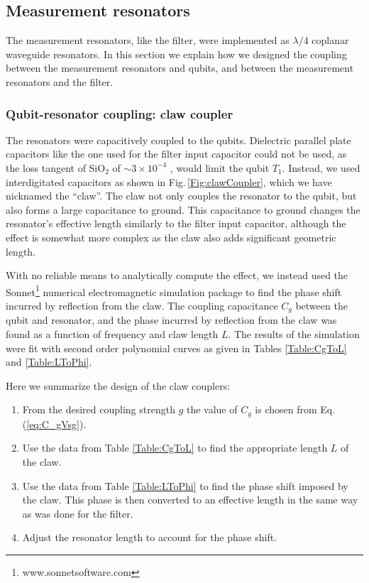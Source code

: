\subsection{Measurement resonators}

The measurement resonators, like the filter, were implemented as $\lambda/4$ coplanar waveguide resonators.
In this section we explain how we designed the coupling between the measurement resonators and qubits, and between the measurement resonators and the filter.

\subsubsection{Qubit-resonator coupling: claw coupler}

The resonators were capacitively coupled to the qubits.
Dielectric parallel plate capacitors like the one used for the filter input capacitor could not be used, as the loss tangent of SiO$_2$ of $\sim 3\times10^{-4}$ \cite{OConnell:microwaveLoss2008}, would limit the qubit $T_1$.
Instead, we used interdigitated capacitors as shown in Fig.\,\ref{Fig:clawCoupler}, which we have nicknamed the ``claw''.
The claw not only couples the resonator to the qubit, but also forms a large capacitance to ground.
This capacitance to ground changes the resonator's effective length similarly to the filter input capacitor, although the effect is somewhat more complex as the claw also adds significant geometric length.

With no reliable means to analytically compute the effect, we instead used the Sonnet\footnote{www.sonnetsoftware.com} numerical electromagnetic simulation package to find the phase shift incurred by reflection from the claw.
The coupling capacitance $C_g$ between the qubit and resonator, and the phase incurred by reflection from the claw was found as a function of frequency and claw length $L$.
The results of the simulation were fit with second order polynomial curves as given in Tables \ref{Table:CgToL} and \ref{Table:LToPhi}.

Here we summarize the design of the claw couplers:
\begin{enumerate}
 \item From the desired coupling strength $g$ the value of $C_g$ is chosen from Eq.\,(\ref{eq:C_gVsg}).
 \item Use the data from Table \ref{Table:CgToL} to find the appropriate length $L$ of the claw.
 \item Use the data from Table \ref{Table:LToPhi} to find the phase shift imposed by the claw. This phase is then converted to an effective length in the same way as was done for the filter.
 \item Adjust the resonator length to account for the phase shift.
\end{enumerate}

